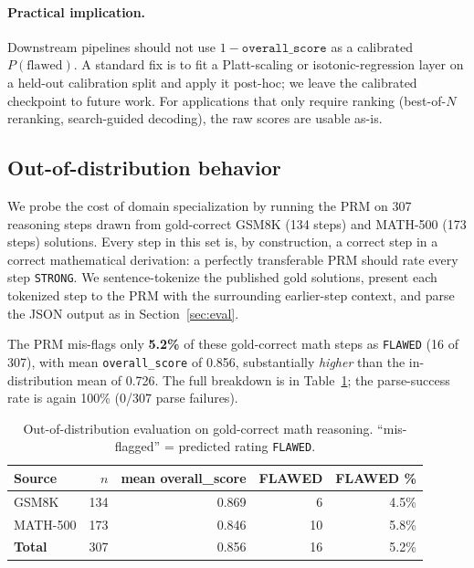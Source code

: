 \documentclass[10pt,letterpaper]{article}
\begin{document}
\paragraph{Practical implication.} Downstream pipelines should not use $1 - \texttt{overall\_score}$ as a calibrated $P(\text{flawed})$. A standard fix is to fit a Platt-scaling or isotonic-regression layer on a held-out calibration split and apply it post-hoc; we leave the calibrated checkpoint to future work. For applications that only require ranking (best-of-$N$ reranking, search-guided decoding), the raw scores are usable as-is.

\subsection{Out-of-distribution behavior}

We probe the cost of domain specialization by running the PRM on 307 reasoning steps drawn from gold-correct GSM8K (134 steps) and MATH-500 (173 steps) solutions. Every step in this set is, by construction, a correct step in a correct mathematical derivation: a perfectly transferable PRM should rate every step \texttt{STRONG}. We sentence-tokenize the published gold solutions, present each tokenized step to the PRM with the surrounding earlier-step context, and parse the JSON output as in Section~\ref{sec:eval}.

The PRM mis-flags only \textbf{5.2\%} of these gold-correct math steps as \texttt{FLAWED} (16 of 307), with mean \texttt{overall\_score} of 0.856, substantially \emph{higher} than the in-distribution mean of 0.726. The full breakdown is in Table~\ref{tab:ood}; the parse-success rate is again 100\% (0/307 parse failures).

\begin{table}[!ht]
\centering
\small
\caption{Out-of-distribution evaluation on gold-correct math reasoning. ``mis-flagged'' = predicted rating \texttt{FLAWED}.}
\label{tab:ood}
\begin{tabular}{lrrrr}
\toprule
Source & $n$ & mean overall\_score & FLAWED & FLAWED \% \\
\midrule
GSM8K          & 134 & 0.869 & 6  & 4.5\% \\
MATH-500       & 173 & 0.846 & 10 & 5.8\% \\
\midrule
\textbf{Total} & 307 & 0.856 & 16 & 5.2\% \\
\bottomrule
\end{tabular}
\end{table}
\end{document}
